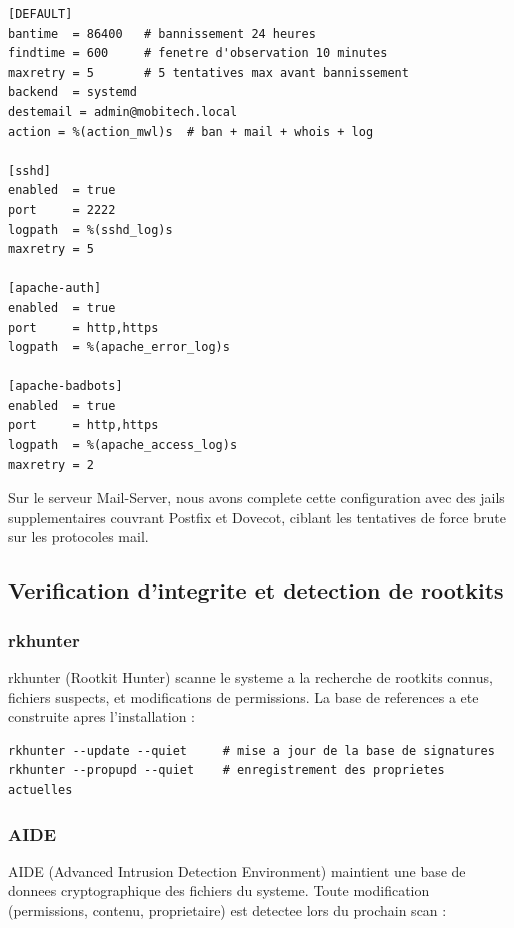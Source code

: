 \documentclass[11pt,a4paper]{article}
\begin{document}
\begin{lstlisting}[caption={/etc/fail2ban/jail.local}]
[DEFAULT]
bantime  = 86400   # bannissement 24 heures
findtime = 600     # fenetre d'observation 10 minutes
maxretry = 5       # 5 tentatives max avant bannissement
backend  = systemd
destemail = admin@mobitech.local
action = %(action_mwl)s  # ban + mail + whois + log

[sshd]
enabled  = true
port     = 2222
logpath  = %(sshd_log)s
maxretry = 5

[apache-auth]
enabled  = true
port     = http,https
logpath  = %(apache_error_log)s

[apache-badbots]
enabled  = true
port     = http,https
logpath  = %(apache_access_log)s
maxretry = 2
\end{lstlisting}

Sur le serveur Mail-Server, nous avons complete cette configuration avec des jails supplementaires couvrant Postfix et Dovecot, ciblant les tentatives de force brute sur les protocoles mail.

\subsection{Verification d'integrite et detection de rootkits}

\subsubsection{rkhunter}

rkhunter (Rootkit Hunter) scanne le systeme a la recherche de rootkits connus, fichiers suspects, et modifications de permissions. La base de references a ete construite apres l'installation :

\begin{lstlisting}[caption={Initialisation de rkhunter}]
rkhunter --update --quiet     # mise a jour de la base de signatures
rkhunter --propupd --quiet    # enregistrement des proprietes actuelles
\end{lstlisting}

\subsubsection{AIDE}

AIDE (Advanced Intrusion Detection Environment) maintient une base de donnees cryptographique des fichiers du systeme. Toute modification (permissions, contenu, proprietaire) est detectee lors du prochain scan :
\end{document}
